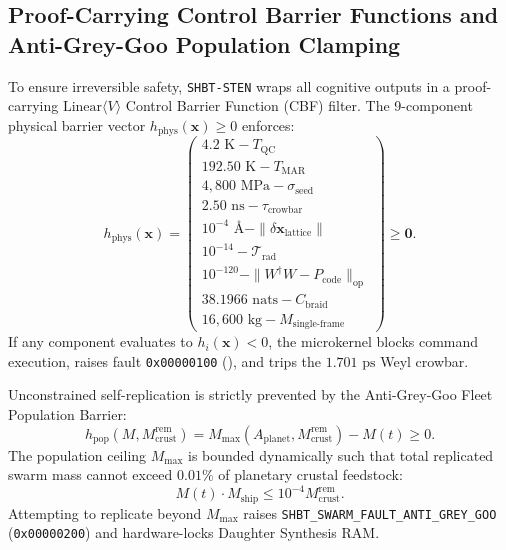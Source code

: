 \documentclass[11pt,onecolumn]{article}
\begin{document}
\subsection{Proof-Carrying Control Barrier Functions and Anti-Grey-Goo Population Clamping}
To ensure irreversible safety, \texttt{SHBT-STEN} wraps all cognitive outputs in a proof-carrying $\text{Linear}\langle V\rangle$ Control Barrier Function (CBF) filter. The 9-component physical barrier vector $h_{\text{phys}}(\mathbf{x}) \ge 0$ enforces:
\begin{equation}
h_{\text{phys}}(\mathbf{x}) = \begin{pmatrix}
4.2\text{ K} - T_{\text{QC}} \\
192.50\text{ K} - T_{\text{MAR}} \\
4{,}800\text{ MPa} - \sigma_{\text{seed}} \\
2.50\text{ ns} - \tau_{\text{crowbar}} \\
10^{-4}\text{ \AA} - \|\delta\mathbf{x}_{\text{lattice}}\| \\
10^{-14} - \mathcal{T}_{\text{rad}} \\
10^{-120} - \|W^\dagger W - P_{\text{code}}\|_{\text{op}} \\
38.1966\text{ nats} - C_{\text{braid}} \\
16{,}600\text{ kg} - M_{\text{single-frame}}
\end{pmatrix} \ge \mathbf{0}.
\label{eq:cbf_9_component}
\end{equation}
If any component evaluates to $h_i(\mathbf{x}) < 0$, the microkernel blocks command execution, raises fault \texttt{0x00000100} (), and trips the $1.701\text{ ps}$ Weyl crowbar.

Unconstrained self-replication is strictly prevented by the Anti-Grey-Goo Fleet Population Barrier:
\begin{equation}
h_{\text{pop}}(M, M_{\text{crust}}^{\text{rem}}) = M_{\max}\left(A_{\text{planet}}, M_{\text{crust}}^{\text{rem}}\right) - M(t) \ge 0.
\label{eq:anti_grey_goo_cbf}
\end{equation}
The population ceiling $M_{\max}$ is bounded dynamically such that total replicated swarm mass cannot exceed $0.01\%$ of planetary crustal feedstock:
\begin{equation}
M(t) \cdot M_{\text{ship}} \le 10^{-4} M_{\text{crust}}^{\text{rem}}.
\end{equation}
Attempting to replicate beyond $M_{\max}$ raises \texttt{SHBT\_SWARM\_FAULT\_ANTI\_GREY\_GOO} (\texttt{0x00000200}) and hardware-locks Daughter Synthesis RAM.
\end{document}
